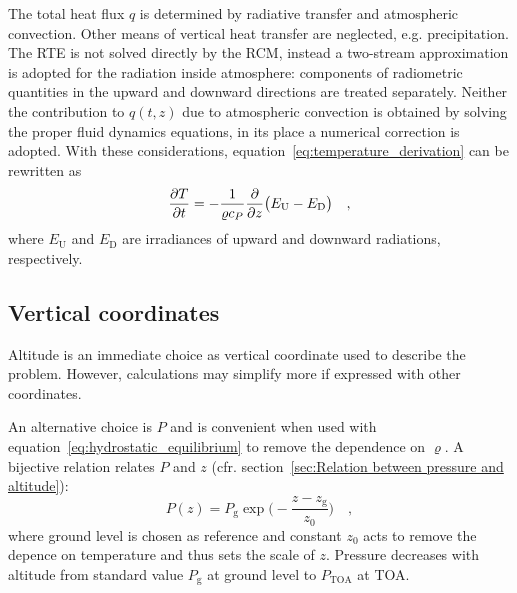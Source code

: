 \documentclass[a4paper,10pt,twocolumn,\classoptions]{article}
\newcommand{\PTOA}{P_\text{TOA}}
\begin{document}
The total heat flux $q$ is determined by radiative transfer and atmospheric convection. Other means of vertical heat transfer are neglected, e.g. precipitation. The RTE is not solved directly by the RCM, instead a two-stream approximation is adopted for the radiation inside atmosphere: components of radiometric quantities in the upward and downward directions are treated separately. Neither the contribution to $q(t,z)$ due to atmospheric convection is obtained by solving the proper fluid dynamics equations, in its place a numerical correction is adopted.
With these considerations, equation~\eqref{eq:temperature_derivation} can be rewritten as
\begin{equation}
  \label{eq:temperature}
  \pdv{T}{t} = -\frac{1}{\varrho c_P} \pdv*{\big( E_\text{U} - E_\text{D} \big)}{z}
  \quad ,
\end{equation}
where $E_\text{U}$ and $E_\text{D}$ are irradiances of upward and downward radiations, respectively.



\subsection{Vertical coordinates}
\label{sec:Vertical coordinates}
Altitude is an immediate choice as vertical coordinate used to describe the problem. However, calculations may simplify more if expressed with other coordinates.

An alternative choice is $P$ and is convenient when used with equation~\eqref{eq:hydrostatic_equilibrium} to remove the dependence on $\varrho$. A bijective relation relates $P$ and $z$ (cfr. section~\ref{sec:Relation between pressure and altitude}):
\begin{equation}
  \label{eq:pressure_altitude}
  P(z) = P_\text{g} \exp{\bigg( - \frac{z - z_\text{g}}{z_0} \bigg)}
  \quad ,
\end{equation}
where ground level is chosen as reference and constant $z_0$ acts to remove the depence on temperature and thus sets the scale of $z$. Pressure decreases with altitude from standard value $P_\text{g}$ at ground level to $\PTOA$ at TOA.
\end{document}
